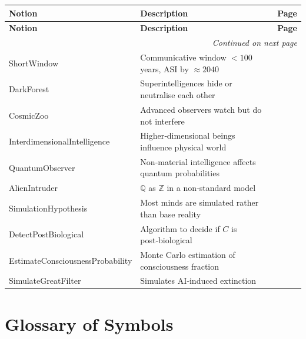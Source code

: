 \documentclass{amsart}
\newenvironment{notiontable}{%
	\renewcommand{\arraystretch}{1.2}%
	\setlength{\tabcolsep}{4pt}%
	\begin{longtable}{|l|l|c|}
		\hline
		\textbf{Notion} & \textbf{Description} & \textbf{Page} \\
		\hline
		\endfirsthead
		\hline
		\textbf{Notion} & \textbf{Description} & \textbf{Page} \\
		\hline
		\endhead
		\hline
		\multicolumn{3}{r}{\textit{Continued on next page}} \\
		\endfoot
		\hline
		\endlastfoot
	}{%
	\end{longtable}%
}
\theoremstyle{break}
\newcommand{\idx}[1]{\index{#1}}
\begin{document}
\begin{notiontable}
	ShortWindow & Communicative window $<100$ years, ASI by $\approx2040$ & \pageref{thm:short-window} \\
	DarkForest & Superintelligences hide or neutralise each other & \pageref{thm:dark-forest} \\
	CosmicZoo & Advanced observers watch but do not interfere & \pageref{thm:cosmic-zoo} \\
	InterdimensionalIntelligence & Higher‑dimensional beings influence physical world & \pageref{thm:interdimensional-intelligence} \\
	QuantumObserver & Non‑material intelligence affects quantum probabilities & \pageref{thm:quantum-observer} \\
	AlienIntruder & $\mathbb{Q}$ as $\mathbb{Z}$ in a non‑standard model & \pageref{thm:alien-intruder} \\
	SimulationHypothesis & Most minds are simulated rather than base reality & \pageref{thm:simulation-hypothesis} \\
	
	DetectPostBiological & Algorithm to decide if $C$ is post‑biological & \pageref{sec:algorithmic-implementation} \\
	EstimateConsciousnessProbability & Monte Carlo estimation of consciousness fraction & \pageref{sec:algorithmic-implementation} \\
	SimulateGreatFilter & Simulates AI‑induced extinction & \pageref{sec:algorithmic-implementation} \\
\end{notiontable}


\section{Glossary of Symbols}
\label{sec:glossary}
\idx{Glossary of symbols}
\fontsize{9}{15}\selectfont
\end{document}
